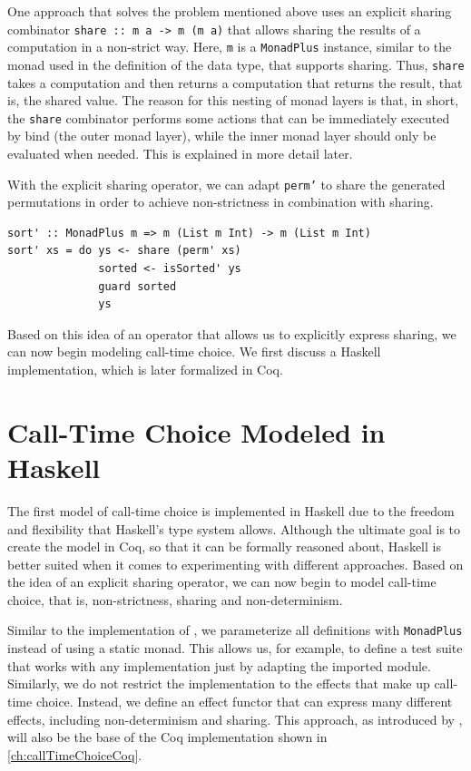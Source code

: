 \documentclass[a4paper, 11pt, fleqn, twoside]{scrreprt}
\newcommand{\hinl}[1]{\texttt{#1}}
\begin{document}
One approach that solves the problem mentioned above uses an explicit sharing combinator \hinl{share :: m a -> m (m a)} that allows sharing the results of a computation in a non-strict way.
Here, \hinl{m} is a \hinl{MonadPlus} instance, similar to the monad used in the definition of the data type, that supports sharing.
Thus, \hinl{share} takes a  computation and then returns a computation that returns the result, that is, the shared value.
The reason for this nesting of monad layers is that, in short, the \hinl{share} combinator performs some actions that can be immediately executed by bind (the outer monad layer), while the inner monad layer should only be evaluated when needed.
This is explained in more detail later.

With the explicit sharing operator, we can adapt \hinl{perm'} to share the generated permutations in order to achieve non-strictness in combination with sharing.

\begin{verbatim}
sort' :: MonadPlus m => m (List m Int) -> m (List m Int)
sort' xs = do ys <- share (perm' xs)
              sorted <- isSorted' ys
              guard sorted
              ys
\end{verbatim}

Based on this idea of an operator that allows us to explicitly express sharing, we can now begin modeling call-time choice.
We first discuss a Haskell implementation, which is later formalized in Coq.

\chapter{Call-Time Choice Modeled in Haskell}
\label{ch:callTimeChoiceHaskell}
The first model of call-time choice is implemented in Haskell due to the freedom and flexibility that Haskell's type system allows.
Although the ultimate goal is to create the model in Coq, so that it can be formally reasoned about, Haskell is better suited when it comes to experimenting with different approaches.
Based on the idea of an explicit sharing operator, we can now begin to model call-time choice, that is, non-strictness, sharing and non-determinism.

Similar to the implementation of \citet{fischer2009purely}, we parameterize all definitions with \hinl{MonadPlus} instead of using a static monad.
This allows us, for example, to define a test suite that works with any implementation just by adapting the imported module.
Similarly, we do not restrict the implementation to the effects that make up call-time choice.
Instead, we define an effect functor that can express many different effects, including non-determinism and sharing.
This approach, as introduced by \citet{wu2014effect}, will also be the base of the Coq implementation shown in \autoref{ch:callTimeChoiceCoq}.
\end{document}

